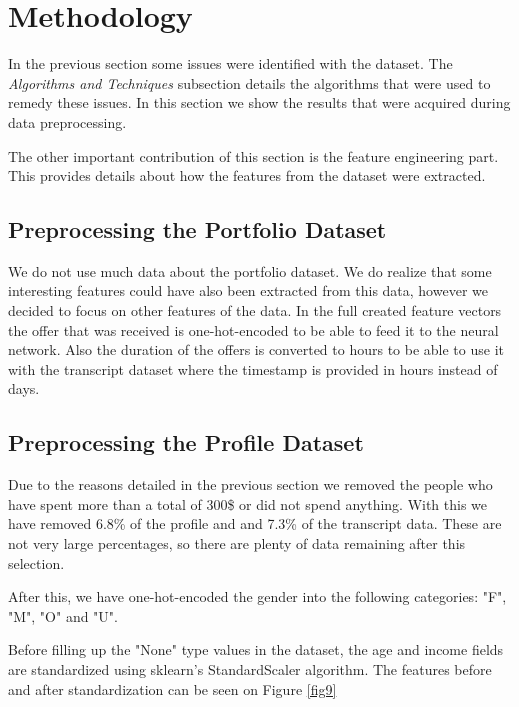 \section{Methodology} \label{sec3}

In the previous section some issues were identified with the dataset. The \textit{Algorithms and Techniques} subsection details the algorithms that were used to remedy these issues. In this section we show the results that were acquired during data preprocessing.

The other important contribution of this section is the feature engineering part. This provides details about how the features from the dataset were extracted.

\subsection{Preprocessing the Portfolio Dataset} \label{sec3.1}

We do not use much data about the portfolio dataset. We do realize that some interesting features could have also been extracted from this data, however we decided to focus on other features of the data. In the full created feature vectors the offer that was received is one-hot-encoded to be able to feed it to the neural network. Also the duration of the offers is converted to hours to be able to use it with the transcript dataset where the timestamp is provided in hours instead of days.

\subsection{Preprocessing the Profile Dataset} \label{sec3.2}

Due to the reasons detailed in the previous section we removed the people who have spent more than a total of 300\$ or did not spend anything. With this we have removed 6.8\% of the profile and and 7.3\% of the transcript data. These are not very large percentages, so there are plenty of data remaining after this selection.

After this, we have one-hot-encoded the gender into the following categories: "F", "M", "O" and "U". 

Before filling up the "None" type values in the dataset, the age and income fields are standardized using sklearn's StandardScaler algorithm. The features before and after standardization can be seen on Figure \ref{fig9}

